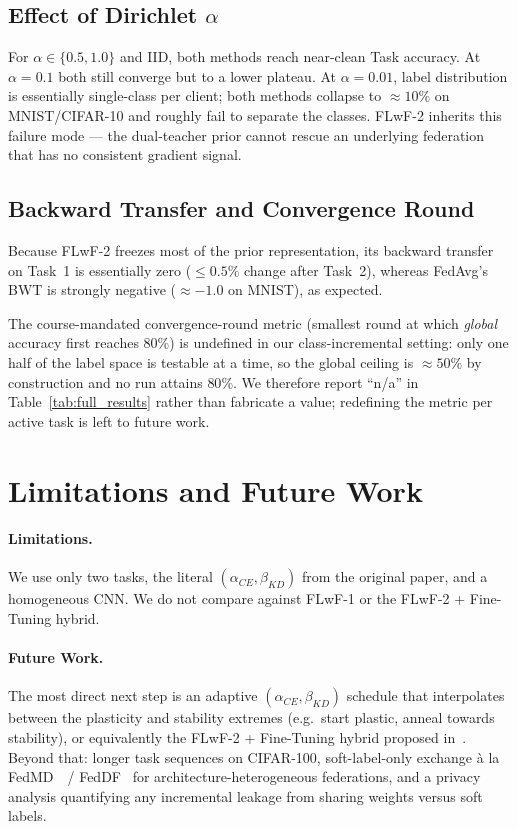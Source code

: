 \documentclass[journal]{IEEEtran}
\begin{document}
\subsection{Effect of Dirichlet $\alpha$}

For $\alpha\!\in\!\{0.5,1.0\}$ and IID, both methods reach near-clean
Task accuracy. At $\alpha\!=\!0.1$ both still converge but to a lower
plateau. At $\alpha\!=\!0.01$, label distribution is essentially
single-class per client; both methods collapse to $\approx 10\%$ on
MNIST/CIFAR-10 and roughly fail to separate the classes. FLwF-2
inherits this failure mode --- the dual-teacher prior cannot rescue an
underlying federation that has no consistent gradient signal.

\subsection{Backward Transfer and Convergence Round}

Because FLwF-2 freezes most of the prior representation, its backward
transfer on Task~1 is essentially zero ($\le 0.5\%$ change after
Task~2), whereas FedAvg's BWT is strongly negative ($\approx -1.0$ on
MNIST), as expected.

The course-mandated convergence-round metric (smallest round at which
\emph{global} accuracy first reaches $80\%$) is undefined in our
class-incremental setting: only one half of the label space is
testable at a time, so the global ceiling is $\approx 50\%$ by
construction and no run attains $80\%$. We therefore report ``n/a''
in Table~\ref{tab:full_results} rather than fabricate a value;
redefining the metric per active task is left to future work.

\section{Limitations and Future Work}
\label{sec:limitations}

\paragraph{Limitations.}
We use only two tasks, the literal $(\alpha_{CE},\beta_{KD})$ from
the original paper, and a homogeneous CNN. We do not compare against
FLwF-1 or the FLwF-2 + Fine-Tuning hybrid.

\paragraph{Future Work.}
The most direct next step is an adaptive
$(\alpha_{CE},\beta_{KD})$ schedule that interpolates between the
plasticity and stability extremes (e.g.\ start plastic, anneal
towards stability), or equivalently the FLwF-2 + Fine-Tuning hybrid
proposed in~\cite{flwf}. Beyond that: longer task sequences on
CIFAR-100, soft-label-only exchange à la FedMD~\cite{fedmd}~/
FedDF~\cite{feddf} for architecture-heterogeneous federations, and
a privacy analysis quantifying any incremental leakage from sharing
weights versus soft labels.
\end{document}
